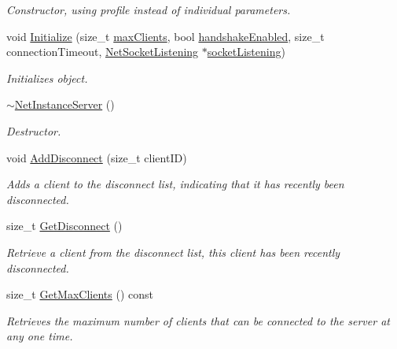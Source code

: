 \begin{DoxyCompactItemize}
\begin{DoxyCompactList}\small\item\em Constructor, using profile instead of individual parameters. \item\end{DoxyCompactList}\item 
void \hyperlink{class_net_instance_server_a6f6c3fb0a639d85d251fe746838df2d8}{Initialize} (size\_\-t \hyperlink{class_net_instance_server_ae08f9f216c652168e54dc0f86dff2416}{maxClients}, bool \hyperlink{class_net_instance_t_c_p_af13f96901d3006beeda0c161f32cbfde}{handshakeEnabled}, size\_\-t connectionTimeout, \hyperlink{class_net_socket_listening}{NetSocketListening} $\ast$\hyperlink{class_net_instance_server_a5c00d75b589e62553821f7278d0e851e}{socketListening})
\begin{DoxyCompactList}\small\item\em Initializes object. \item\end{DoxyCompactList}\item 
\hyperlink{class_net_instance_server_aea6efa8d9213d060c8976a776030bd64}{$\sim$NetInstanceServer} ()
\begin{DoxyCompactList}\small\item\em Destructor. \item\end{DoxyCompactList}\item 
void \hyperlink{class_net_instance_server_ad3ddeb6490be9a07235582b221b1f4aa}{AddDisconnect} (size\_\-t clientID)
\begin{DoxyCompactList}\small\item\em Adds a client to the disconnect list, indicating that it has recently been disconnected. \item\end{DoxyCompactList}\item 
size\_\-t \hyperlink{class_net_instance_server_a263c1e81f7f756f2102da0c01abffc62}{GetDisconnect} ()
\begin{DoxyCompactList}\small\item\em Retrieve a client from the disconnect list, this client has been recently disconnected. \item\end{DoxyCompactList}\item 
size\_\-t \hyperlink{class_net_instance_server_ab436ece5c02fa04fe425cfcfd6656656}{GetMaxClients} () const 
\begin{DoxyCompactList}\small\item\em Retrieves the maximum number of clients that can be connected to the server at any one time. \item\end{DoxyCompactList}\item 

\end{DoxyCompactItemize}

